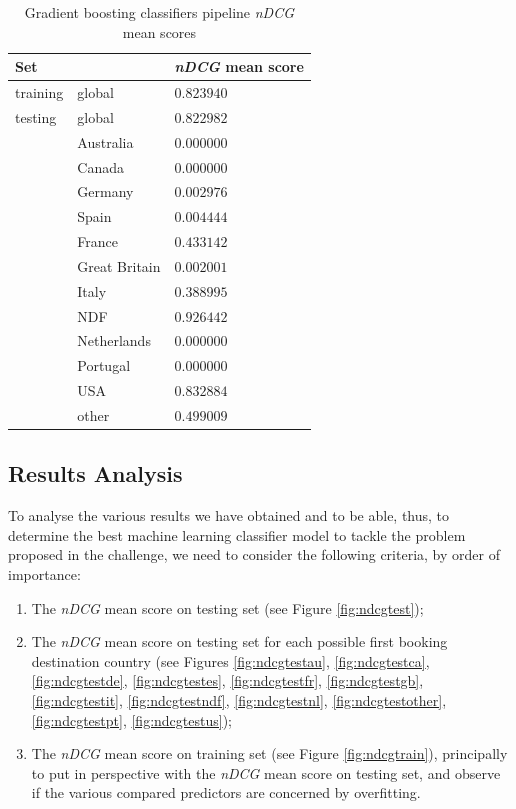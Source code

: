 \documentclass[twocolumn, switch]{article}
\begin{document}
\begin{table}[H]
\caption{Gradient boosting classifiers pipeline \textit{nDCG} mean scores}
\centering
\begin{tabular}{lll}
\toprule
Set & & \textit{nDCG} mean score \\
\midrule
training & global & $0.823940$ \\
testing & global & $0.822982$ \\
& Australia & $0.000000$ \\
& Canada & $0.000000$ \\
& Germany & $0.002976$ \\
& Spain & $0.004444$ \\
& France & $0.433142$ \\
& Great Britain & $0.002001$ \\
& Italy & $0.388995$ \\
& NDF & $0.926442$ \\
& Netherlands & $0.000000$ \\
& Portugal & $0.000000$ \\
& USA & $0.832884$ \\
& other & $0.499009$ \\
\bottomrule
\end{tabular}
\label{tab:gbcp}
\end{table}

\subsection{Results Analysis}

To analyse the various results we have obtained and to be able, thus, to determine the best machine learning classifier model to tackle the problem proposed in the challenge, we need to consider the following criteria, by order of importance:
\begin{enumerate}
\item The \textit{nDCG} mean score on testing set (see Figure \ref{fig:ndcgtest});
\item The \textit{nDCG} mean score on testing set for each possible first booking destination country (see Figures \ref{fig:ndcgtestau}, \ref{fig:ndcgtestca}, \ref{fig:ndcgtestde}, \ref{fig:ndcgtestes}, \ref{fig:ndcgtestfr}, \ref{fig:ndcgtestgb}, \ref{fig:ndcgtestit}, \ref{fig:ndcgtestndf}, \ref{fig:ndcgtestnl}, \ref{fig:ndcgtestother}, \ref{fig:ndcgtestpt}, \ref{fig:ndcgtestus});
\item The \textit{nDCG} mean score on training set (see Figure \ref{fig:ndcgtrain}), principally to put in perspective with the \textit{nDCG} mean score on testing set, and observe if the various compared predictors are concerned by overfitting.
\end{enumerate}
\end{document}
